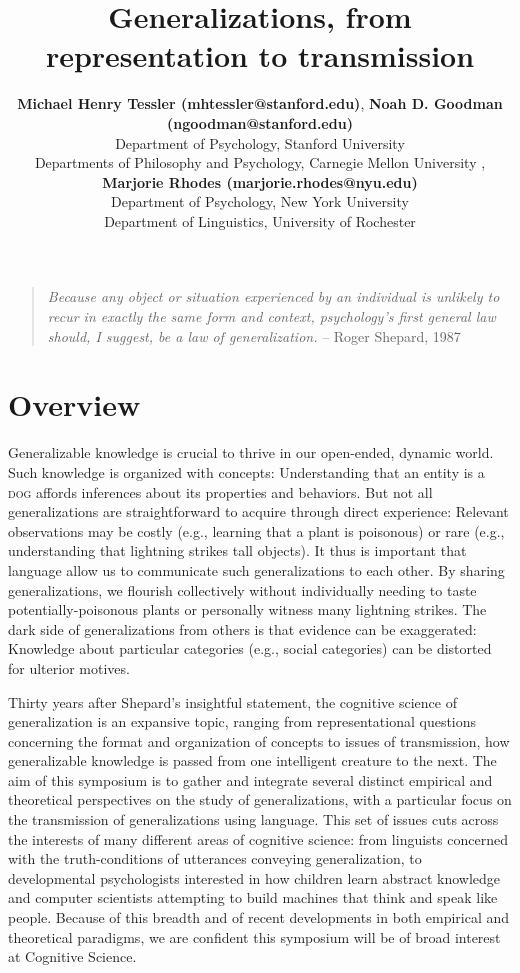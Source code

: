 \documentclass[10pt,letterpaper]{article}
\title{Generalizations, from representation to transmission}
\author{{\large \bf Michael Henry Tessler (mhtessler@stanford.edu)}, {\large \bf Noah D. Goodman (ngoodman@stanford.edu)}  \\
  Department of Psychology, Stanford University \vspace{-0.1cm}
   \AND {\large \bf David Danks (ddanks@cmu.edu)} \\
  Departments of Philosophy and Psychology, Carnegie Mellon University \vspace{-0.1cm}
    \AND{\large \bf Emily Foster-Hanson (emily.fosterhanson@nyu.edu)}, {\large \bf Marjorie Rhodes (marjorie.rhodes@nyu.edu)} \\
  Department of Psychology, New York University \vspace{-0.1cm}
    \AND {\large \bf Gregory Carlson (calrson@ling.rochester.edu)} \\
  Department of Linguistics, University of Rochester \vspace{-0.1cm}
  }
\begin{document}
\maketitle



\begin{quote}
\emph{Because any object or situation experienced by an individual is unlikely to recur in exactly the same form and context, psychology's first general law should, I suggest, be a law of generalization.}  -- Roger Shepard, 1987
\end{quote}

\section{Overview}

Generalizable knowledge is crucial to thrive in our open-ended, dynamic world. 
Such knowledge is organized with concepts: Understanding that an entity is a \textsc{dog} affords inferences about its properties and behaviors. 
But not all generalizations are straightforward to acquire through direct experience: Relevant observations may be costly (e.g., learning that a plant is poisonous) or rare (e.g., understanding that lightning strikes tall objects). 
It thus is important that language allow us to communicate such generalizations to each other. 
By sharing generalizations, we flourish collectively without individually needing to taste potentially-poisonous plants or personally witness many lightning strikes.
The dark side of generalizations from others is that evidence can be exaggerated: Knowledge about particular categories (e.g., social categories) can be distorted for ulterior motives. 

Thirty years after Shepard's insightful statement, the cognitive science of generalization is an expansive topic, ranging from representational questions concerning the format and organization of concepts to issues of transmission, how generalizable knowledge is passed from one intelligent creature to the next.
The aim of this symposium is to gather and integrate several distinct empirical and theoretical perspectives on the study of generalizations, with a particular focus on the transmission of generalizations using language.
This set of issues cuts across the interests of many different areas of cognitive science: from linguists concerned with the truth-conditions of utterances conveying generalization, to developmental psychologists interested in how children learn abstract knowledge and computer scientists attempting to build machines that think and speak like people. 
Because of this breadth and of recent developments in both empirical and theoretical paradigms, we are confident this symposium will be of broad interest at Cognitive Science.
\end{document}
